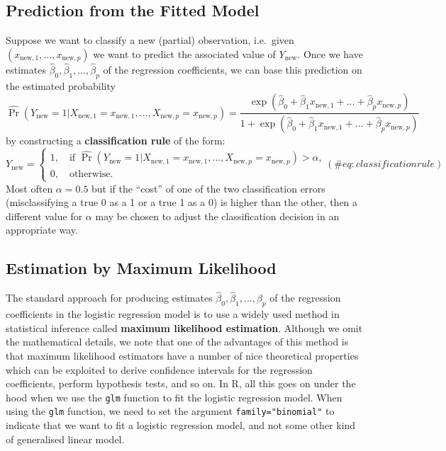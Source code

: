 \documentclass[
]{article}
\begin{document}
\hypertarget{prediction-from-the-fitted-model}{%
\subsection{Prediction from the Fitted
Model}\label{prediction-from-the-fitted-model}}

Suppose we want to classify a new (partial) observation, i.e.~given
\((x_{\text{new},1}, \ldots, x_{\text{new},p})\) we want to predict the
associated value of \(Y_{\text{new}}\). Once we have estimates
\(\hat{\beta}_0, \hat{\beta}_1, \ldots, \hat{\beta}_p\) of the
regression coefficients, we can base this prediction on the estimated
probability \begin{equation*}
\hat{\Pr}(Y_{\text{new}} = 1 | X_{\text{new},1}=x_{\text{new},1}, \ldots, X_{\text{new},p}=x_{\text{new},p}) = \frac{\exp(\hat{\beta}_0 + \hat{\beta}_1 x_{\text{new},1} + \ldots + \hat{\beta}_p x_{\text{new},p})}{1 + \exp(\hat{\beta}_0 + \hat{\beta}_1 x_{\text{new},1} + \ldots + \hat{\beta}_p x_{\text{new},p})}
\end{equation*} by constructing a \textbf{classification rule} of the
form: \begin{equation}
Y_{\text{new}} = 
\begin{cases}
1, \quad \text{if $\hat{\Pr}(Y_{\text{new}} = 1 | X_{\text{new},1}=x_{\text{new},1}, \ldots, X_{\text{new},p}=x_{\text{new},p}) > \alpha$,}\\
0, \quad \text{otherwise}.
\end{cases}(\#eq:classificationrule)
\end{equation} Most often \(\alpha = 0.5\) but if the ``cost'' of one of
the two classification errors (misclassifying a true 0 as a 1 or a true
1 as a 0) is higher than the other, then a different value for
\(\alpha\) may be chosen to adjust the classification decision in an
appropriate way.

\hypertarget{estimation-by-maximum-likelihood}{%
\subsection{Estimation by Maximum
Likelihood}\label{estimation-by-maximum-likelihood}}

The standard approach for producing estimates
\(\hat{\beta}_0, \hat{\beta}_1, \ldots, \hat{\beta}_p\) of the
regression coefficients in the logistic regression model is to use a
widely used method in statistical inference called \textbf{maximum
likelihood estimation}. Although we omit the mathematical details, we
note that one of the advantages of this method is that maximum
likelihood estimators have a number of nice theoretical properties which
can be exploited to derive confidence intervals for the regression
coefficients, perform hypothesis tests, and so on. In R, all this goes
on under the hood when we use the \texttt{glm} function to fit the
logistic regression model. When using the \texttt{glm} function, we need
to set the argument \texttt{family="binomial"} to indicate that we want
to fit a logistic regression model, and not some other kind of
generalised linear model.
\end{document}
